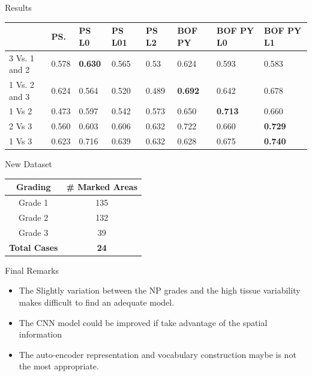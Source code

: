 \documentclass[usenames,dvipsnames]{beamer}
\begin{document}
\begin{frame}{Results}

\begin{table}[l]
\begin{tabular}{|m{1.2cm}|m{1cm}|m{1cm}|m{1cm}|m{1cm}||m{1cm}|m{1cm}|m{1cm}|}
\hline
              & PS.  & PS L0   & PS L01 & PS L2 & BOF PY          & BOF PY L0       & BOF PY L1\\ \hline
3 Vs. 1 and 2 & 0.578     & \textbf{0.630} & 0.565        & 0.53         & 0.624          & 0.593           & 0.583\\ \hline
1 Vs. 2 and 3 & 0.624    & 0.564          & 0.520         & 0.489        & \textbf{0.692} & 0.642           & 0.678\\ \hline
1 Vs 2        & 0.473     & 0.597          & 0.542         & 0.573        & 0.650           & \textbf{0.713} & 0.660\\ \hline
2 Vs 3        & 0.560     & 0.603          & 0.606         & 0.632        & 0.722          & 0.660           & \textbf{0.729}\\ \hline
1 Vs 3        & 0.623     & 0.716          & 0.639         & 0.632       & 0.628          & 0.675         & \textbf{0.740} \\ \hline
\end{tabular}
\end{table}
    
\end{frame}



\begin{frame}{New Dataset}
    \begin{table}[]
\begin{tabular}{|c|c|}
\hline
Grading              & \# Marked Areas \\ \hline
Grade 1              & 135             \\ \hline
Grade 2              & 132             \\ \hline
Grade 3              & 39              \\ \hline\hline
\textbf{Total Cases} & \textbf{24}     \\ \hline
\end{tabular}
\end{table}
\end{frame}



\begin{frame}{Final Remarks}

\begin{itemize}
    \item The Slightly variation between the NP grades and the high tissue variability makes difficult to find an adequate model.
    \item The CNN model could be improved if take advantage of the spatial information
    \item The auto-encoder representation and vocabulary construction maybe is not the most appropriate.
\end{itemize}
    
\end{frame}
\end{document}

